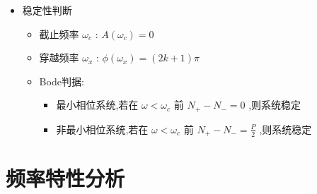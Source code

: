 \documentclass[table]{article}
\begin{document}
\begin{frame}
\begin{itemize}
\item 稳定性判断
\label{sec-4-2-1-2}%
\begin{itemize}
\item 截止频率 $\omega_c$ : $A(\omega_c)=0$
\item 穿越频率 $\omega_x$ : $\phi(\omega_x)=(2k+1)\pi$
\item <3->Bode判据:
\begin{itemize}
\item 最小相位系统,若在 $\omega<\omega_c$ 前 $N_+-N_-=0$ ,则系统稳定
\item 非最小相位系统,若在 $\omega<\omega_c$ 前 $N_+-N_-=\frac{P}{2}$ ,则系统稳定
\end{itemize}
\end{itemize}


\end{itemize} %
\end{frame}
\section{频率特性分析}
\label{sec-5}
\end{document}
